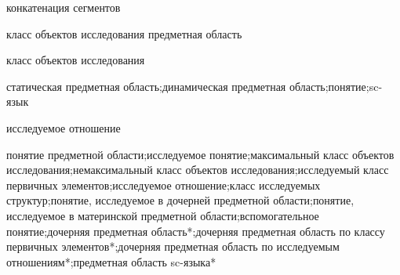 \begin{SCn}
\scnsectionheader{\currentname}
\begin{scnsubstruct}
\begin{scnreltovector}{конкатенация сегментов}


\end{scnreltovector}
\begin{scnhaselementrole}{класс объектов исследования} предметная область
\end{scnhaselementrole}
\begin{scnhaselementrolelist}{класс объектов исследования}

статическая предметная область;динамическая предметная область;понятие;sc-язык

\end{scnhaselementrolelist}
\begin{scnhaselementrolelist}{исследуемое отношение}

понятие предметной области\scnrolesign ;исследуемое понятие\scnrolesign ;максимальный класс объектов исследования\scnrolesign ;немаксимальный класс объектов исследования\scnrolesign ;исследуемый класс первичных элементов\scnrolesign ;исследуемое отношение\scnrolesign ;класс исследуемых структур\scnrolesign ;понятие, исследуемое в дочерней предметной области\scnrolesign ;понятие, исследуемое в материнской предметной области\scnrolesign ;вспомогательное понятие\scnrolesign ;дочерняя предметная область*;дочерняя предметная область по классу первичных элементов*;дочерняя предметная область по исследуемым отношениям*;предметная область sc-языка*


\end{scnhaselementrolelist}
\end{scnsubstruct}
\end{SCn}

